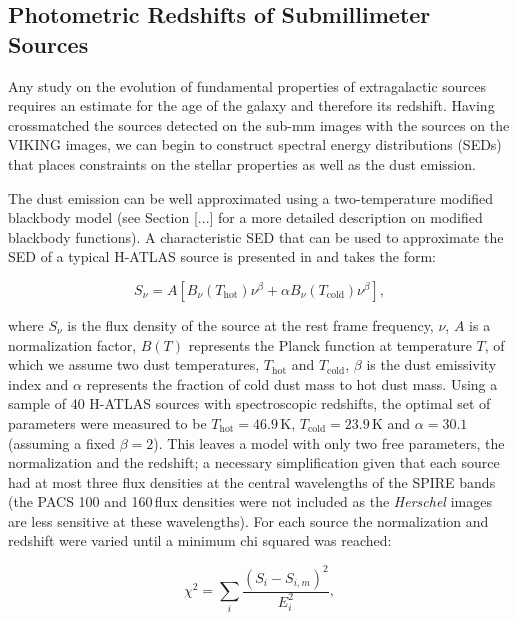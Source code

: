 \subsection{Photometric Redshifts of Submillimeter Sources}
\label{sec:phot_z_Herschel}

Any study on the evolution of fundamental properties of extragalactic sources requires an estimate for the age of the galaxy and therefore its redshift. Having crossmatched the sources detected on the sub-mm images with the sources on the VIKING images, we can begin to construct spectral energy distributions (SEDs) that places constraints on the stellar properties as well as the dust emission. 

The dust emission can be well approximated using a two-temperature modified blackbody model (see Section [...] for a more detailed description on modified blackbody functions). A characteristic SED that can be used to approximate the SED of a typical H-ATLAS source is presented in \citealt{Pearson_2013} and takes the form:

\begin{equation}
    S_\nu = A[B_\nu(T_{\textrm{hot}})\nu^\beta + \alpha B_\nu(T_{\textrm{cold}})\nu^\beta],
\label{eq:pearson_sed_model}
\end{equation}

where $S_\nu$ is the flux density of the source at the rest frame frequency, $\nu$, $A$ is a normalization factor, $B(T)$ represents the Planck function at temperature $T$, of which we assume two dust temperatures, $T_{\textrm{hot}}$ and $T_{\textrm{cold}}$, $\beta$ is the dust emissivity index and $\alpha$ represents the fraction of cold dust mass to hot dust mass. Using a sample of 40 H-ATLAS sources with spectroscopic redshifts, the optimal set of parameters were measured to be $T_{\textrm{hot}} = 46.9$\,K, $T_{\textrm{cold}} = 23.9$\,K and $\alpha = 30.1$ (assuming a fixed $\beta = 2$). This leaves a model with only two free parameters, the normalization and the redshift; a necessary simplification given that each source had at most three flux densities at the central wavelengths of the SPIRE bands (the PACS 100 and 160\,\micron flux densities were not included as the \textit{Herschel} images are less sensitive at these wavelengths). For each source the normalization and redshift were varied until a minimum chi squared was reached:

\begin{equation}
    \chi^2 = \sum_i \frac{(S_i - S_{i,m})^2}{E_i^2},
\end{equation}

